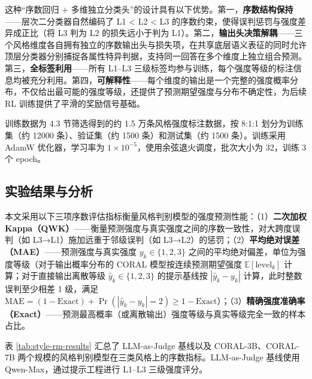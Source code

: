 \documentclass[fontset=fandol,type=master,campus=shenzhen,etitleauto=true]{hithesisbook}
\begin{document}
这种``序数回归 + 多维独立分类头''的设计具有以下优势。第一，\textbf{序数结构保持}------层次二分类器自然编码了 L1 < L2 < L3 的序数约束，使得误判惩罚与强度差异成正比（将 L3 判为 L2 的损失远小于判为 L1）。第二，\textbf{输出头决策解耦}------三个风格维度各自拥有独立的序数输出头与损失项，在共享底层语义表征的同时允许顶层分类器分别捕捉各属性特异判据，支持同一回答在多个维度上独立组合预测。第三，\textbf{全标签利用}------所有 L1--L3 三级标签均参与训练，每个强度等级的标注信息均被充分利用。第四，\textbf{可解释性}------每个维度的输出是一个完整的强度概率分布，不仅给出最可能的强度等级，还提供了预测期望强度与分布不确定性，为后续 RL 训练提供了平滑的奖励信号基础。

训练数据为 4.3 节筛选得到的约 1.5 万条风格强度标注数据，按 8:1:1 划分为训练集（约 12000 条）、验证集（约 1500 条）和测试集（约 1500 条）。训练采用 AdamW 优化器，学习率为 $1 \times 10^{-5}$，使用余弦退火调度，批次大小为 32，训练 3 个 epoch。

\subsection{实验结果与分析}\label{ux98ceux683cux5224ux522bux5b9eux9a8cux7ed3ux679c}

本文采用以下三项序数评估指标衡量风格判别模型的强度预测性能：（1）\textbf{二次加权 Kappa（QWK）}------衡量预测强度与真实强度之间的序数一致性，对大跨度误判（如 L3→L1）施加远重于邻级误判（如 L3→L2）的惩罚；（2）\textbf{平均绝对误差（MAE）}------预测强度与真实强度 $y_k \in \{1,2,3\}$ 之间的平均绝对偏差，单位为强度等级（对于输出概率分布的 CORAL 模型按连续预测期望强度 $\mathbb{E}[\text{level}_k]$ 计算；对于直接输出离散等级 $\hat{y}_k \in \{1,2,3\}$ 的提示基线按 $|\hat{y}_k - y_k|$ 计算，此时整数误判至少相差 1 级，满足 $\text{MAE} = (1 - \text{Exact}) + \Pr(|\hat{y}_k - y_k|=2) \ge 1 - \text{Exact}$）；（3）\textbf{精确强度准确率（Exact）}------预测最高概率（或离散输出）强度等级与真实等级完全一致的样本占比。

表 \ref{tab:style-rm-results} 汇总了 LLM-as-Judge 基线以及 CORAL-3B、CORAL-7B 两个规模的风格判别模型在三类风格上的序数指标。LLM-as-Judge 基线使用 Qwen-Max，通过提示工程进行 L1--L3 三级强度评分。
\end{document}
